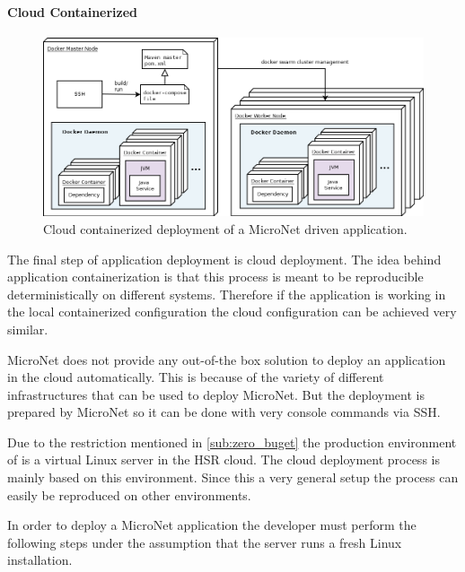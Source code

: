 \paragraph{Cloud Containerized}

\begin{figure}
	\hspace*{-0.8cm}
	\centering
	\includegraphics[width=1.1\textwidth]{images/architecture/DeploymentCloudContainerized}
	\caption{Cloud containerized deployment of a MicroNet driven application.}
	\label{fig:deployment_cloud_containerized}
\end{figure}

The final step of \ms{} application deployment is cloud deployment. The idea
behind application containerization is that this process is meant to be
reproducible deterministically on different systems. Therefore if the
application is working in the local containerized configuration the cloud
configuration can be achieved very similar.

MicroNet does not provide any out-of-the box solution to deploy an application
in the cloud automatically. This is because of the variety of different
infrastructures that can be used to deploy MicroNet. But the deployment is
prepared by MicroNet so it can be done with very console commands via SSH.

Due to the restriction mentioned in \autoref{sub:zero_buget} the production
environment of \mn{} is a virtual Linux server in the HSR cloud. The cloud
deployment process is mainly based on this environment. Since this a very
general setup the process can easily be reproduced on other environments.

In order to deploy a MicroNet \ms{} application the developer must perform the
following steps under the assumption that the server runs a fresh Linux
installation.

